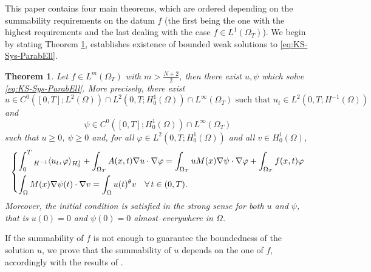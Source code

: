\documentclass{amsart}
\numberwithin{equation}{section}
\newtheorem{theo}[example]{Theorem}
\def\elle#1{L^{#1}}
\def\elleom#1{L^{#1}(\Omega)}
\def\elleomT#1{L^{#1}(\Omega_T)}
\def\H{H^1_0}
\def\Hom{H^1_0(\Omega)}
\def\io{\int_\Omega}
\def\ioT{\int_{\Omega_T}}
\begin{document}
This paper contains four main theorems, which are ordered depending on the summability requirements on the datum $f$ (the first being the one with the highest requirements and the last dealing with the case $f\in\elleomT1$). We begin by stating Theorem \ref{Main_Theorem_1}, establishes existence of bounded weak solutions to \eqref{eq:KS-Sys-ParabEll}.

\begin{theo}\label{Main_Theorem_1}
    Let $f\in\elle m(\Omega_T)$ with $m>\frac{N+2}{2}$, then there exist $u,\psi$ which solve \eqref{eq:KS-Sys-ParabEll}. More precisely, there exist 
    $$u\in C^0([0,T];\elleom2)\cap\elle2(0,T;\Hom)\cap\elle\infty(\Omega_T)\text{ such that }u_t\in\elle2(0,T;H^{-1}(\Omega))$$
     and 
    $$\psi\in C^0([0,T];\Hom)\cap\elle\infty(\Omega_T)$$ such that $u\geq0$, $\psi\geq0$ and, for all $\varphi\in\elle2(0,T;\Hom)$ and all $v\in\Hom$,
    \begin{equation}\label{DefSol_parabell_theo1}
        \begin{dcases}
                \int_0^T {}_{H^{-1}}\langle u_t,\varphi\rangle_{\H}+\ioT A(x,t)\nabla u\cdot \nabla \varphi = \ioT uM(x)\nabla \psi\cdot\nabla\varphi + \ioT f(x,t)\varphi\\
                \io M(x)\nabla \psi(t)\cdot\nabla v = \io u(t)^\theta v\quad\forall\,t\in(0,T).
        \end{dcases}
    \end{equation}
    Moreover, the initial condition is satisfied in the strong sense for both $u$ and $\psi$, that is $u(0)=0$ and $\psi(0)=0$ almost--everywhere in $\Omega$.
\end{theo}

If the summability of $f$ is not enough to guarantee the boundedness of the solution $u$, we prove that the summability of $u$ depends on the one of $f$, accordingly with the results of \cite{BDGO-parabolic}.
\end{document}
